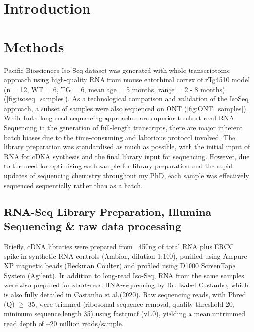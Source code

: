 \section{Introduction}

 


\newpage
\section{Methods}
Pacific Biosciences Iso-Seq dataset was generated with whole transcriptome approach using high-quality RNA from mouse entorhinal cortex of rTg4510 model (n = 12, WT = 6, TG = 6, mean age = 5 months, range = 2 - 8 months) (\cref{fig:isoseq_samples}). As a technological comparison and validation of the IsoSeq approach, a subset of samples were also sequenced on ONT (\cref{fig:ONT_samples}). While both long-read sequencing approaches are superior to short-read RNA-Sequencing in the generation of full-length transcripts, there are major inherent batch biases due to the time-consuming and laborious protocol involved. The library preparation was standardised as much as possible, with the initial input of RNA for cDNA synthesis and the final library input for sequencing. However, due to the need for optimising each sample for library preparation and the rapid updates of sequencing chemistry throughout my PhD, each sample was effectively sequenced sequentially rather than as a batch. 

\subsection{RNA-Seq Library Preparation, Illumina Sequencing \& raw data processing}
\label{section: ch2_rna_extraction}
Briefly, cDNA libraries were prepared from ~450ng of total RNA plus ERCC spike-in synthetic RNA controls (Ambion, dilution 1:100), purified using Ampure XP magnetic beads (Beckman Coulter) and profiled using D1000 ScreenTape System (Agilent). 
In addition to long-read Iso-Seq, RNA from the same samples were also prepared for short-read RNA-sequencing by Dr. Isabel Castanho, which is also fully detailed in Castanho et al.(2020)\cite{Castanho2020}. Raw sequencing reads, with Phred (Q) $\geq$ 35, were trimmed (ribosomal sequence removal, quality threshold 20, minimum sequence length 35) using fastqmcf (v1.0), yielding a mean untrimmed read depth of \textasciitilde{}20 million reads/sample. 
 

